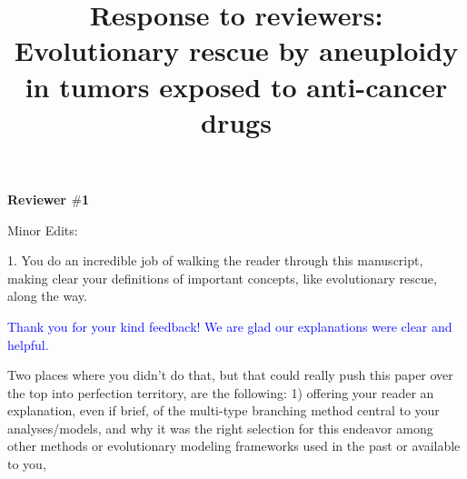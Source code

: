\documentclass[12pt]{extarticle}
\title{
	Response to reviewers: \\ Evolutionary rescue by aneuploidy in tumors exposed to anti-cancer drugs \\ 
}
\begin{document}
\maketitle

\textbf{Reviewer $\#$1}




Minor Edits:

1. You do an incredible job of walking the reader through this manuscript, making clear your definitions of important concepts, like evolutionary rescue, along the way. 

\textcolor{blue}{Thank you for your kind feedback! We are glad our explanations were clear and helpful.}

Two places where you didn't do that, but that could really push this paper over the top into perfection territory, are the following: 1) offering your reader an explanation, even if brief, of the multi-type branching method central to your analyses/models, and why it was the right selection for this endeavor among other methods or evolutionary modeling frameworks used in the past or available to you,
\end{document}
